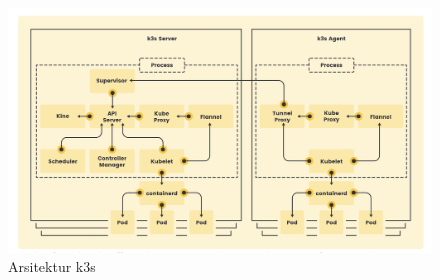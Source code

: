 \begin{figure}[ht]
  \centering
  \includegraphics[width=1\textwidth]{resources/chapter-2/arsitektur-k3s.jpg}
  \caption{Arsitektur k3s \parencite{k3s}}
  \label{fig:arsitektur-k3s}
\end{figure}
